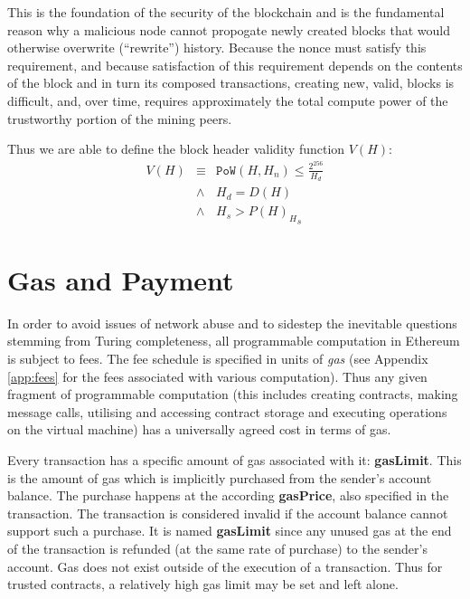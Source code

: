 \documentclass[9pt,oneside]{amsart}
\begin{document}
\begin{multicols}{2}
This is the foundation of the security of the blockchain and is the fundamental reason why a malicious node cannot propogate newly created blocks that would otherwise overwrite (``rewrite'') history. Because the nonce must satisfy this requirement, and because satisfaction of this requirement depends on the contents of the block and in turn its composed transactions, creating new, valid, blocks is difficult, and, over time, requires approximately the total compute power of the trustworthy portion of the mining peers.

Thus we are able to define the block header validity function $V(H)$:
\begin{eqnarray}
V(H) & \equiv & \mathtt{PoW}(H, H_n) \leqslant \frac{2^{256}}{H_d} \\
& \wedge & H_d = D(H) \\
& \wedge & H_s > {P(H)_H}_s
\end{eqnarray}

\section{Gas and Payment} \label{ch:payment}

In order to avoid issues of network abuse and to sidestep the inevitable questions stemming from Turing completeness, all programmable computation in Ethereum is subject to fees. The fee schedule is specified in units of \textit{gas} (see Appendix \ref{app:fees} for the fees associated with various computation). Thus any given fragment of programmable computation (this includes creating contracts, making message calls, utilising and accessing contract storage and executing operations on the virtual machine) has a universally agreed cost in terms of gas.

Every transaction has a specific amount of gas associated with it: \textbf{gasLimit}. This is the amount of gas which is implicitly purchased from the sender's account balance. The purchase happens at the according \textbf{gasPrice}, also specified in the transaction. The transaction is considered invalid if the account balance cannot support such a purchase. It is named \textbf{gasLimit} since any unused gas at the end of the transaction is refunded (at the same rate of purchase) to the sender's account. Gas does not exist outside of the execution of a transaction. Thus for trusted contracts, a relatively high gas limit may be set and left alone.


\end{multicols}
\end{document}
